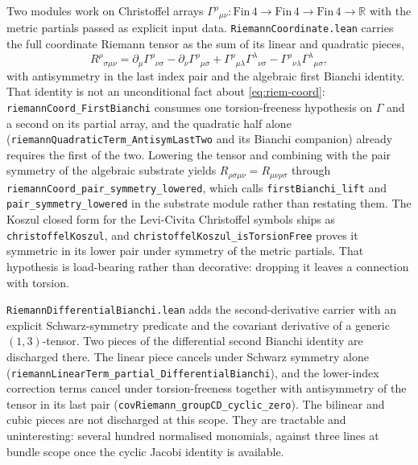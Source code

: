 \documentclass[11pt]{article}
\begin{document}
Two modules work on Christoffel arrays
$\Gamma^{\rho}{}_{\mu\nu} : \mathrm{Fin}\,4 \to \mathrm{Fin}\,4 \to
\mathrm{Fin}\,4 \to \mathbb{R}$ with the metric partials passed as
explicit input data. \texttt{RiemannCoordinate.lean} carries the full
coordinate Riemann tensor as the sum of its linear and quadratic pieces,
\begin{equation}
R^{\rho}{}_{\sigma\mu\nu}
  = \partial_{\mu}\Gamma^{\rho}{}_{\nu\sigma}
  - \partial_{\nu}\Gamma^{\rho}{}_{\mu\sigma}
  + \Gamma^{\rho}{}_{\mu\lambda}\Gamma^{\lambda}{}_{\nu\sigma}
  - \Gamma^{\rho}{}_{\nu\lambda}\Gamma^{\lambda}{}_{\mu\sigma},
\label{eq:riem-coord}
\end{equation}
with antisymmetry in the last index pair and the algebraic first Bianchi
identity. That identity is not an unconditional fact about
\eqref{eq:riem-coord}: \texttt{riemannCoord\_FirstBianchi} consumes one
torsion-freeness hypothesis on $\Gamma$ and a second on its partial
array, and the quadratic half alone
(\texttt{riemannQuadraticTerm\_AntisymLastTwo} and its Bianchi
companion) already requires the first of the two. Lowering the tensor
and combining with the pair symmetry of the algebraic substrate yields
$R_{\rho\sigma\mu\nu} = R_{\mu\nu\rho\sigma}$ through
\texttt{riemannCoord\_pair\_symmetry\_lowered}, which calls
\texttt{firstBianchi\_lift} and \texttt{pair\_symmetry\_lowered} in the
substrate module rather than restating them. The Koszul closed form for
the Levi-Civita Christoffel symbols ships as \texttt{christoffelKoszul},
and \texttt{christoffelKoszul\_isTorsionFree} proves it symmetric in its
lower pair under symmetry of the metric partials. That hypothesis is
load-bearing rather than decorative: dropping it leaves a connection
with torsion.

\texttt{RiemannDifferentialBianchi.lean} adds the second-derivative
carrier with an explicit Schwarz-symmetry predicate and the covariant
derivative of a generic $(1,3)$-tensor. Two pieces of the differential
second Bianchi identity are discharged there. The linear piece cancels
under Schwarz symmetry alone
(\texttt{riemannLinearTerm\_partial\_DifferentialBianchi}), and the
lower-index correction terms cancel under torsion-freeness together with
antisymmetry of the tensor in its last pair
(\texttt{covRiemann\_groupCD\_cyclic\_zero}). The bilinear and cubic
pieces are not discharged at this scope. They are tractable and
uninteresting: several hundred normalised monomials, against three lines
at bundle scope once the cyclic Jacobi identity is available.
\end{document}
